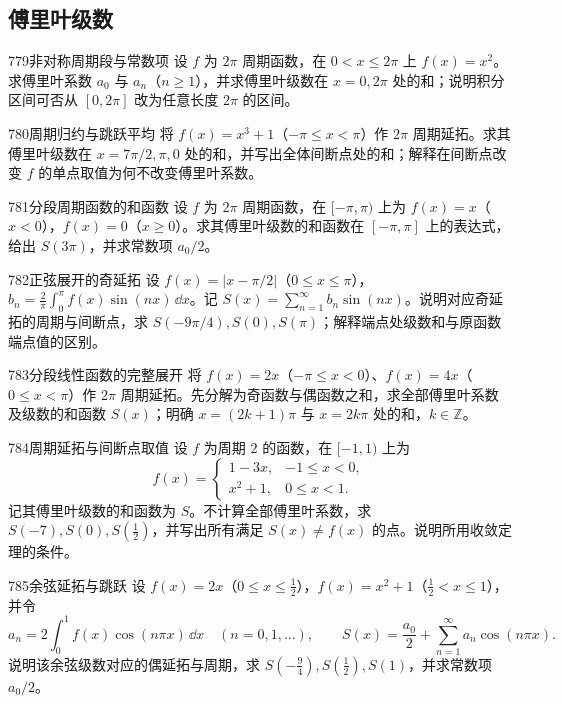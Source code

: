 \subsection{傅里叶级数}
\begin{exercise}{779}{非对称周期段与常数项}
设 $f$ 为 $2\pi$ 周期函数，在 $0<x\le2\pi$ 上 $f(x)=x^2$。求傅里叶系数 $a_0$ 与 $a_n$（$n\ge1$），并求傅里叶级数在 $x=0,2\pi$ 处的和；说明积分区间可否从 $[0,2\pi]$ 改为任意长度 $2\pi$ 的区间。
\end{exercise}
\begin{exercise}{780}{周期归约与跳跃平均}
将 $f(x)=x^3+1$（$-\pi\le x<\pi$）作 $2\pi$ 周期延拓。求其傅里叶级数在 $x=7\pi/2,\pi,0$ 处的和，并写出全体间断点处的和；解释在间断点改变 $f$ 的单点取值为何不改变傅里叶系数。
\end{exercise}
\begin{exercise}{781}{分段周期函数的和函数}
设 $f$ 为 $2\pi$ 周期函数，在 $[-\pi,\pi)$ 上为 $f(x)=x$（$x<0$），$f(x)=0$（$x\ge0$）。求其傅里叶级数的和函数在 $[-\pi,\pi]$ 上的表达式，给出 $S(3\pi)$，并求常数项 $a_0/2$。
\end{exercise}
\begin{exercise}{782}{正弦展开的奇延拓}
设 $f(x)=|x-\pi/2|$（$0\le x\le\pi$），$b_n=\frac2\pi\int_0^\pi f(x)\sin(nx)\,\dd x$。记 $S(x)=\sum_{n=1}^{\infty}b_n\sin(nx)$。说明对应奇延拓的周期与间断点，求 $S(-9\pi/4),S(0),S(\pi)$；解释端点处级数和与原函数端点值的区别。
\end{exercise}
\begin{exercise}{783}{分段线性函数的完整展开}
将 $f(x)=2x$（$-\pi\le x<0$）、$f(x)=4x$（$0\le x<\pi$）作 $2\pi$ 周期延拓。先分解为奇函数与偶函数之和，求全部傅里叶系数及级数的和函数 $S(x)$；明确 $x=(2k+1)\pi$ 与 $x=2k\pi$ 处的和，$k\in\mathbb Z$。
\end{exercise}
\begin{exercise}{784}{周期延拓与间断点取值}
设 $f$ 为周期 $2$ 的函数，在 $[-1,1)$ 上为
\[f(x)=\begin{cases}1-3x,&-1\le x<0,\\x^2+1,&0\le x<1.\end{cases}\]
记其傅里叶级数的和函数为 $S$。不计算全部傅里叶系数，求 $S(-7),S(0),S(\frac12)$，并写出所有满足 $S(x)\ne f(x)$ 的点。说明所用收敛定理的条件。
\end{exercise}
\begin{exercise}{785}{余弦延拓与跳跃}
设 $f(x)=2x$（$0\le x\le\frac12$），$f(x)=x^2+1$（$\frac12<x\le1$），并令
\[a_n=2\int_0^1f(x)\cos(n\pi x)\,\dd x\quad(n=0,1,\ldots),\qquad
S(x)=\frac{a_0}2+\sum_{n=1}^{\infty}a_n\cos(n\pi x).\]
说明该余弦级数对应的偶延拓与周期，求 $S(-\frac94),S(\frac12),S(1)$，并求常数项 $a_0/2$。
\end{exercise}
